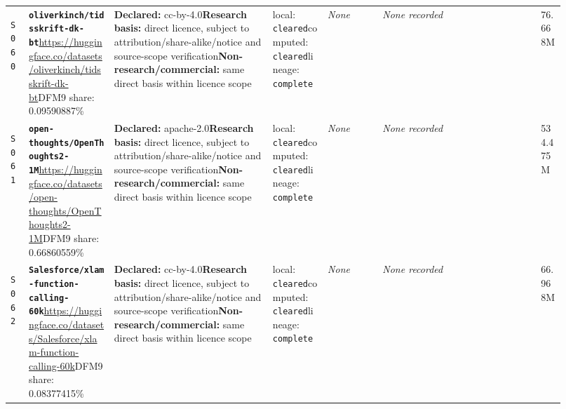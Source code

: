\documentclass[9pt,a4paper]{article}
\newcommand{\srcid}[1]{\hypertarget{src:#1}{\texttt{#1}}}
\begin{document}
\begin{landscape}
\begin{longtable}{@{}L{0.03\linewidth}L{0.14\linewidth}L{0.26\linewidth}L{0.09\linewidth}L{0.09\linewidth}L{0.265\linewidth}L{0.045\linewidth}@{}}
\srcid{S060} & \textbf{\nolinkurl{oliverkinch/tidsskrift-dk-bt}}\newline \url{https://huggingface.co/datasets/oliverkinch/tidsskrift-dk-bt}\newline DFM9 share: 0.09590887\% & \textbf{Declared:} cc-by-4.0\newline \textbf{Research basis:} direct licence, subject to attribution/share-alike/notice and source-scope verification\newline \textbf{Non-research/commercial:} same direct basis within licence scope & local: \texttt{cleared}\newline computed: \texttt{cleared}\newline lineage: \texttt{complete} & \textit{None} & \textit{None recorded} & 76.668M \\
\srcid{S061} & \textbf{\nolinkurl{open-thoughts/OpenThoughts2-1M}}\newline \url{https://huggingface.co/datasets/open-thoughts/OpenThoughts2-1M}\newline DFM9 share: 0.66860559\% & \textbf{Declared:} apache-2.0\newline \textbf{Research basis:} direct licence, subject to attribution/share-alike/notice and source-scope verification\newline \textbf{Non-research/commercial:} same direct basis within licence scope & local: \texttt{cleared}\newline computed: \texttt{cleared}\newline lineage: \texttt{complete} & \textit{None} & \textit{None recorded} & 534.475M \\
\srcid{S062} & \textbf{\nolinkurl{Salesforce/xlam-function-calling-60k}}\newline \url{https://huggingface.co/datasets/Salesforce/xlam-function-calling-60k}\newline DFM9 share: 0.08377415\% & \textbf{Declared:} cc-by-4.0\newline \textbf{Research basis:} direct licence, subject to attribution/share-alike/notice and source-scope verification\newline \textbf{Non-research/commercial:} same direct basis within licence scope & local: \texttt{cleared}\newline computed: \texttt{cleared}\newline lineage: \texttt{complete} & \textit{None} & \textit{None recorded} & 66.968M \\

\end{longtable}
\end{landscape}
\end{document}
